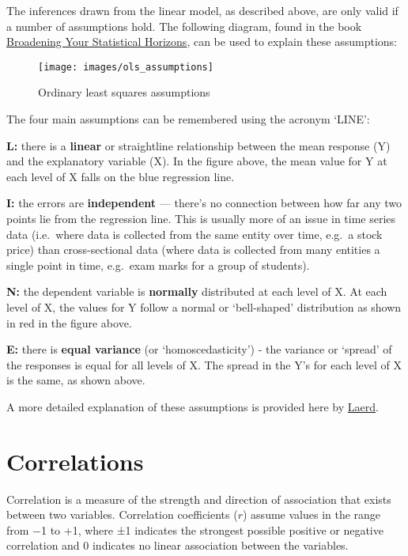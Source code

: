 \documentclass[
  12pt,
]{krantz}
\begin{document}
The inferences drawn from the linear model, as described above, are only valid if a number of assumptions hold. The following diagram, found in the book \href{https://bookdown.org/roback/bookdown-bysh/}{Broadening Your Statistical Horizons}, can be used to explain these assumptions:

\begin{figure}

{\centering \texttt{[image: images/ols\_assumptions]} 

}

\caption{Ordinary least squares assumptions}\label{fig:unnamed-chunk-12}
\end{figure}

The four main assumptions can be remembered using the acronym `LINE':

\textbf{L:} there is a \textbf{linear} or straightline relationship between the mean response (Y) and the explanatory variable (X). In the figure above, the mean value for Y at each level of X falls on the blue regression line.

\textbf{I:} the errors are \textbf{independent} --- there's no connection between how far any two points lie from the regression line. This is usually more of an issue in time series data (i.e.~where data is collected from the same entity over time, e.g.~a stock price) than cross-sectional data (where data is collected from many entities a single point in time, e.g.~exam marks for a group of students).

\textbf{N:} the dependent variable is \textbf{normally} distributed at each level of X. At each level of X, the values for Y follow a normal or `bell-shaped' distribution as shown in red in the figure above.

\textbf{E:} there is \textbf{equal variance} (or `homoscedasticity') - the variance or `spread' of the responses is equal for all levels of X. The spread in the Y's for each level of X is the same, as shown above.

A more detailed explanation of these assumptions is provided here by \href{https://statistics.laerd.com/spss-tutorials/linear-regression-using-spss-statistics.php}{Laerd}.

\hypertarget{correlations}{%
\chapter{Correlations}\label{correlations}}

Correlation is a measure of the strength and direction of association that exists between two variables. Correlation coefficients (\(r\)) assume values in the range from −1 to +1, where ±1 indicates the strongest possible positive or negative correlation and 0 indicates no linear association between the variables.
\end{document}
